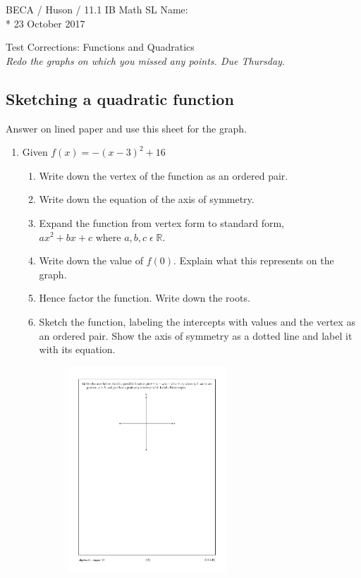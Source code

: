 \documentclass[]{book}
\begin{document}
\noindent BECA / Huson / 11.1 IB Math SL \hspace{2in} Name:\\*
23 October 2017
\begin{center}
{\Large Test Corrections: Functions and Quadratics}\\
\textit{Redo the graphs on which you missed any points. Due Thursday.}
\end{center}

\subsection*{Sketching a quadratic function}
Answer on lined paper and use this sheet for the graph.

\begin{enumerate}


\item   Given $f(x)=-(x-3)^2+16$
\begin{enumerate}
    \item Write down the vertex of the function as an ordered pair.
    \item Write down the equation of the axis of symmetry.
    \item Expand the function from vertex form to standard form, $ax^2+bx+c \text{ where } a, b, c \;  \epsilon \; \mathbb{R}$.
    \item Write down the value of $f(0)$. Explain what this represents on the graph.
    \item Hence factor the function. Write down the roots.
    \item Sketch the function, labeling the intercepts with values and the vertex as an ordered pair. Show the axis of symmetry as a dotted line and label it with its equation.
\begin{figure}[!ht]
    \flushright
    \includegraphics[width=0.6\textwidth]{simple-axes.pdf}
\end{figure}


\end{enumerate}
\end{enumerate}
\end{document}
